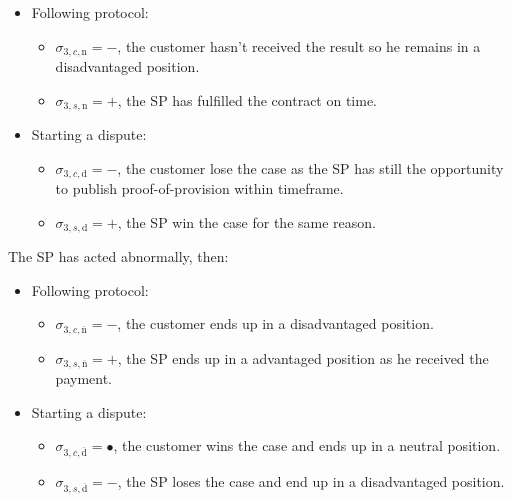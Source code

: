 \documentclass{ieeeaccess}
\begin{document}
\begin{itemize}
\item
  Following protocol:

  \begin{itemize}
  
  \item
    \(\sigma_{3, c, \mathrm{n}} = -\), the customer hasn't received the
    result so he remains in a disadvantaged position.
  \item
    \(\sigma_{3, s, \mathrm{n}} = +\), the SP has fulfilled the contract
    on time.
  \end{itemize}
\item
  Starting a dispute:

  \begin{itemize}
  
  \item
    \(\sigma_{3, c, \mathrm{d}} = -\), the customer lose the case as the
    SP has still the opportunity to publish proof-of-provision within
    timeframe.
  \item
    \(\sigma_{3, s, \mathrm{d}} = +\), the SP win the case for the same
    reason.
  \end{itemize}
\end{itemize}

The SP has acted abnormally, then:

\begin{itemize}
\item
  Following protocol:

  \begin{itemize}
  
  \item
    \(\sigma_{3, c, \overline{\mathrm{n}}} = -\), the customer ends up in a disadvantaged position.
  \item
    \(\sigma_{3, s, \overline{\mathrm{n}}} = +\), the SP ends up in a
    advantaged position as he received the payment.
  \end{itemize}
\item
  Starting a dispute:

  \begin{itemize}
  
  \item
    \(\sigma_{3, c, \overline{\mathrm{d}}} = •\), the customer wins the case and ends up in a neutral position.
  \item
    \(\sigma_{3, s, \overline{\mathrm{d}}} = -\), the SP loses the case
    and end up in a disadvantaged position.
  \end{itemize}
\end{itemize}
\end{document}
